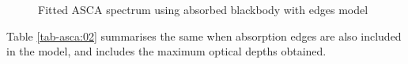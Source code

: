 				\begin{figure}[h!]
					\centering
					\caption{Fitted ASCA spectrum using absorbed blackbody with edges model}
					\label{asca:abs-bb-edge}
				\end{figure}
				
				Table \ref{tab-asca:02} summarises the same when absorption edges are also included in the model, and includes the maximum optical depths obtained.
				
